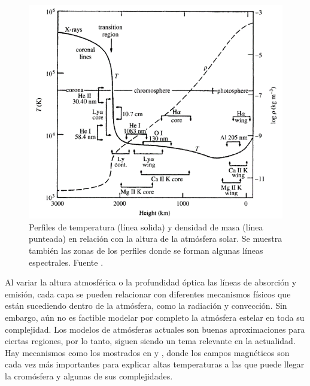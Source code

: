 \documentclass[12pt,oneside,openany,letter]{book}
\begin{document}
\begin{figure}[h]
    \centering
    \includegraphics[width=0.8\linewidth]{Images/perfil_Densidad-temperatura.png}
    \caption[Perfiles de temperatura y densidad de masa en relación con la altura de la atmósfera solar.]{Perfiles de temperatura (línea solida) y densidad de masa (línea punteada) en relación con la altura de la atmósfera solar. Se muestra también las zonas de los perfiles donde se forman algunas líneas espectrales. Fuente \citep{vernazza1973structure}.}
    \label{perfil:densidad-temp}
\end{figure}

Al variar la altura atmosférica o la profundidad óptica las líneas de absorción y emisión, cada capa se pueden relacionar con diferentes mecanismos físicos que están sucediendo dentro de la atmósfera, como la radiación y convección. Sin embargo, aún no es factible modelar por completo la atmósfera estelar en toda su complejidad. Los modelos de atmósferas actuales son buenas aproximaciones para ciertas regiones, por lo tanto, siguen siendo un tema relevante en la actualidad. Hay mecanismos como los mostrados en \citep{chavez2013new} y \citep{ayres2019stellar}, donde los campos magnéticos son cada vez más importantes para explicar altas temperaturas a las que puede llegar la cromósfera y algunas de sus complejidades.
\end{document}
